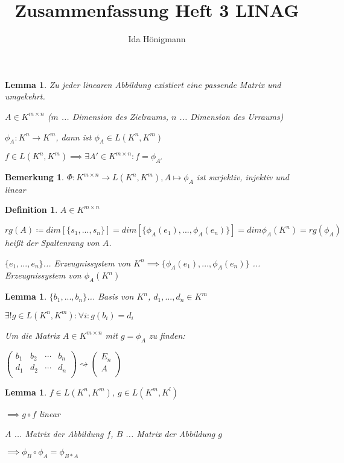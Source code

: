 \documentclass[twocolumn]{article}
\title{Zusammenfassung Heft 3 LINAG}
\author{Ida Hönigmann}
\newtheorem{lemma}[theorem]{Lemma}
\newtheorem{definition}{Definition}[section]
\newtheorem*{remark}{Bemerkung}
\begin{document}
\maketitle

\begin{lemma}
	Zu jeder linearen Abbildung existiert eine passende Matrix und umgekehrt.
	
	$A \in K^{m\times n}$ ($m$ ... Dimension des Zielraums, $n$ ... Dimension des Urraums)
	
	$\phi_A: K^n \rightarrow K^m$, dann ist $\phi_A \in L(K^n, K^m)$
	
	$f \in L(K^n, K^m) \implies \exists A'\in K^{m\times n} : f = \phi_{A'}$
\end{lemma}

\begin{remark}
	$\Phi : K^{m\times n} \rightarrow L(K^n, K^m), A\mapsto \phi_A$ ist surjektiv, injektiv und linear
\end{remark}

\begin{definition}
	$A \in K^{m \times n}$
	
	$rg(A)\coloneqq dim[\{s_1,...,s_n\}] = dim[\{\phi_A(e_1),...,\phi_A(e_n)\}] = dim \phi_A(K^n) = rg(\phi_A)$ heißt der Spaltenrang von $A$.
	
	$\{e_1,...,e_n\}$... Erzeugnissystem von $K^n \implies \{\phi_A(e_1), ...,\phi_A(e_n)\}$ ... Erzeugnissystem von $\phi_A(K^n)$
	 
\end{definition}

\begin{lemma}
	$\{b_1,...,b_n\}$... Basis von $K^n$, $d_1,...,d_n \in K^m$
	
	$\exists! g \in L(K^n, K^m) : \forall i : g(b_i) = d_i$
	
	Um die Matrix $A \in K^{m \times n}$ mit $g = \phi_A$ zu finden:
	
	$\begin{pmatrix}
		b_1 & b_2 & \cdots & b_n\\
		d_1 & d_2 & \cdots & d_n\\
	\end{pmatrix}
	\rightsquigarrow
	\begin{pmatrix}
		E_n \\
		A \\
	\end{pmatrix}$
	
\end{lemma}

\begin{lemma}
	$f\in L(K^n, K^m)$, $g\in L(K^m, K^l)$
	
	$\implies g \circ f$ linear
	
	$A$ ... Matrix der Abbildung $f$, $B$ ... Matrix der Abbildung $g$
	
	$\implies \phi_B \circ \phi_A = \phi_{B*A}$
\end{lemma}
\end{document}
